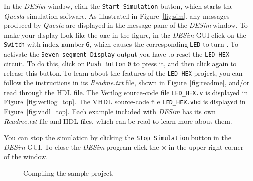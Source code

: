 \documentclass[11pt, twoside, pdftex]{article}
\begin{document}
In the {\it DESim} window, click the \texttt{Start Simulation} button, which starts the
{\it Questa} simulation software. As illustrated in Figure~\ref{fig:sim}, any messages
produced by {\it Questa} are displayed in the message pane of the {\it DESim} window. 
To make your display look like the one in the figure, in the {\it DESim} GUI click on 
the \texttt{Switch} with index number
\texttt{6}, which causes the corresponding \texttt{LED} to turn . To activate the
\texttt{Seven-segment Display} output you have to reset the \texttt{LED\_HEX} circuit. To
do this, click on \texttt{Push Button} \texttt{0} to press it, and then click again to
release this button. 
To learn about the features of the \texttt{LED\_HEX} project, you can follow 
the instructions in its {\it Readme.txt} file, shown in Figure~\ref{fig:readme}, and/or 
read through the HDL file. The Verilog source-code file \texttt{LED\_HEX.v} is displayed in 
Figure~\ref{fig:verilog_top}. The VHDL source-code file \texttt{LED\_HEX.vhd} is displayed in 
Figure~\ref{fig:vhdl_top}. Each example included with {\it DESim} has its own {\it Readme.txt} 
file and HDL files, which can be read to learn more about them.

You can stop the simulation by clicking the \texttt{Stop Simulation} button 
in the {\it DESim} GUI. To close the {\it DESim} program click the $\times$ in 
the upper-right corner of the window.    

\begin{figure}[h]
	\begin{center}
        \setlength{\fboxsep}{0pt}
	\end{center}
          \caption{Compiling the sample project.}
	\label{fig:compile}
\end{figure}
\end{document}
